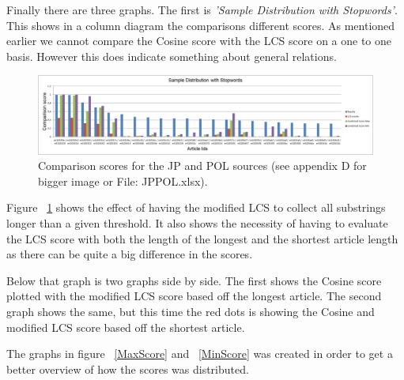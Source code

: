 Finally there are three graphs. The first is \textit{'Sample Distribution with Stopwords'}. This shows in a column diagram the comparisons different scores. As mentioned earlier we cannot compare the Cosine score with the LCS score on a one to one basis. However this does indicate something about general relations.

\begin{figure}
	\centering
	\includegraphics[scale=0.25]{figures/JPPOLScoreGraph}
	\caption{Comparison scores for the JP and POL sources (see appendix D for bigger image or File: JPPOL.xlsx).}
	\label{JPPOLScoreGraph}
\end{figure}

Figure ~\ref{JPPOLScoreGraph} shows the effect of having the modified LCS to collect all substrings longer than a given threshold. It also shows the necessity of having to evaluate the LCS score with both the length of the longest and the shortest article length as there can be quite a big difference in the scores.

Below that graph is two graphs side by side. The first shows the Cosine score plotted with the modified LCS score based off the longest article. The second graph shows the same, but this time the red dots is showing the Cosine and modified LCS score based off the shortest article.

The graphs in figure ~\ref{MaxScore} and ~\ref{MinScore} was created in order to get a better overview of how the scores was distributed. 

